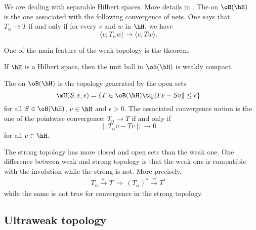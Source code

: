 We are dealing with separable Hilbert spaces. More details in \cite{JonesVN}. The  on $\oB(\hH)$ is the one associated with the following convergence of nets. One says that $T_{\alpha}\to T$ if and only if for every $v$ and $w$ in $\hH$, we have
\begin{equation}
 \langle v, T_{\alpha}w\rangle \to \langle v, Tw\rangle .
\end{equation}

One of the main feature of the weak topology is the  theorem.
\begin{theorem}		\label{ThoBanachAlaoglu}
If $\hH$ is a Hilbert space, then the unit ball in $\oB(\hH)$ is weakly compact.
\end{theorem}


The  on $\oB(\hH)$ is the topology generated by the open sets
\begin{equation}
\mU(S,v,\epsilon)=\{ T\in\oB(\hH)\tq \| Tv-Sv \|\leq\epsilon \}
\end{equation}
for all $S\in\oB(\hH)$, $v\in\hH$ and $\epsilon>0$. The associated convergence notion is the one of the pointwise convergence: $T_{\alpha}\to T$ if and only if
\begin{equation}		\label{EqDEflimforte}
\| T_{\alpha}v-Tv \|\to 0
\end{equation}
 for all $v\in\hH$.

The strong topology has more closed and open sets than the weak one. One difference between weak and strong topology is that the weak one is compatible with the involution while the strong is not. More precisely, \label{PgStarWeakRespecte}
\begin{align}
	T_{\alpha}\stackrel{w}{\to}T\,\Rightarrow\,(T_{\alpha})^*\stackrel{w}{\to}T^*
\end{align}
while the same is not true for convergence in the strong topology.

					\subsection{Ultraweak topology}		\label{subSecUltraWtopol}



